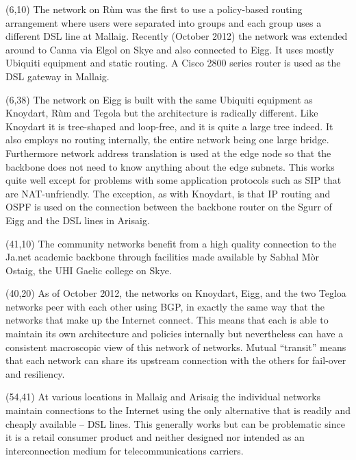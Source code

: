 \documentclass[noborder,onecolumn]{netmap}
\begin{document}
\begin{textblock}{10}(6,10)
  \linespread{1.0}
  \tiny
  The network on Rùm was the first to use a policy-based routing
  arrangement where users were separated into groups and each group uses
  a different DSL line at Mallaig. Recently (October 2012) the network
  was extended around to Canna via Elgol on Skye and also connected to
  Eigg. It uses mostly Ubiquiti equipment and static routing. A Cisco
  2800 series router is used as the DSL gateway in Mallaig.
\end{textblock}
\begin{textblock}{10}(6,38)
  \linespread{1.0}
  \tiny
  The network on Eigg is built with the same Ubiquiti equipment as
  Knoydart, Rùm and Tegola but the architecture is radically
  different. Like Knoydart it is tree-shaped and loop-free, and it is
  quite a large tree indeed. It also employs no routing internally,
  the entire network being one large bridge. Furthermore network
  address translation is used at the edge node so that the backbone
  does not need to know anything about the edge subnets. This works
  quite well except for problems with some application protocols 
  such as SIP that are NAT-unfriendly. The exception, as with
  Knoydart, is that IP routing and OSPF is used on the connection
  between the backbone router on the Sgurr of Eigg and the DSL lines
  in Arisaig.  
\end{textblock}
\begin{textblock}{10}(41,10)
  \linespread{1.0}
  \tiny
  The community networks benefit from a high quality connection to the
  Ja.net academic backbone through facilities made available by Sabhal
  Mòr Ostaig, the UHI Gaelic college on Skye.
\end{textblock}
\begin{textblock}{10}(40,20)
  \linespread{1.0}
  \tiny
  As of October 2012, the networks on Knoydart, Eigg, and the two
  Tegloa networks peer with each other using BGP, in exactly the same
  way that the networks that make up the Internet connect. This means
  that each is able to maintain its own architecture and policies
  internally but nevertheless can have a consistent macroscopic view
  of this network of networks. Mutual ``transit'' means that each
  network can share its upstream connection with the others for
  fail-over and resiliency.
\end{textblock}
\begin{textblock}{10}(54,41)
  \linespread{1.0}
  \tiny
  At various locations in Mallaig and Arisaig the individual networks
  maintain connections to the Internet using the only alternative that
  is readily and cheaply available -- DSL lines. This generally works
  but can be problematic since it is a retail consumer product and
  neither designed nor intended as an interconnection medium for
  telecommunications carriers.
\end{textblock}
\end{document}
